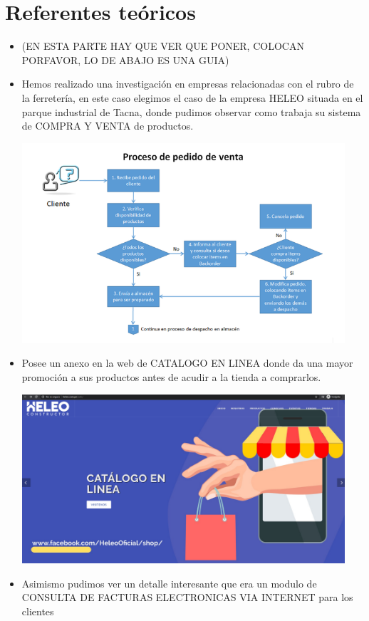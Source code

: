 \documentclass[preprint,12pt]{elsarticle}
\begin{document}
	\section{Referentes teóricos}
\begin{itemize} 
 \item (EN ESTA PARTE HAY QUE VER QUE PONER, COLOCAN PORFAVOR, LO DE ABAJO ES UNA GUIA)

    \item Hemos realizado una investigación en empresas relacionadas con el rubro de la ferretería, en este caso elegimos el caso de la empresa HELEO situada en el parque industrial de Tacna, donde pudimos observar como trabaja su sistema de COMPRA Y VENTA de productos.
	\begin{center}
	\includegraphics[width=12cm]{./imagen/1} 
	\end{center}
	\item Posee un anexo en la web de CATALOGO EN LINEA donde da una mayor promoción a sus productos antes de acudir a la tienda a comprarlos.
	\begin{center}
	\includegraphics[width=12cm]{./imagen/2} 
	\end{center}
	\item Asimismo pudimos ver un detalle interesante que era un modulo de CONSULTA DE FACTURAS ELECTRONICAS VIA INTERNET para los clientes

\end{itemize}
\end{document}
